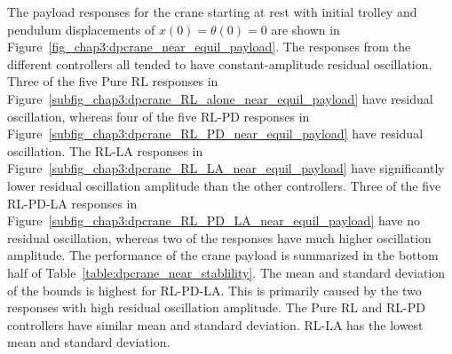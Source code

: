 The payload responses for the crane starting at rest with initial trolley and pendulum displacements of $x(0)=\theta(0)=0$ are shown in Figure~\ref{fig_chap3:dpcrane_near_equil_payload}. The responses from the different controllers all tended to have constant-amplitude residual oscillation.
%
Three of the five Pure RL responses in Figure~\ref{subfig_chap3:dpcrane_RL_alone_near_equil_payload} have residual oscillation, whereas four of the five RL-PD responses in Figure~\ref{subfig_chap3:dpcrane_RL_PD_near_equil_payload} have residual oscillation.
The RL-LA responses in Figure~\ref{subfig_chap3:dpcrane_RL_LA_near_equil_payload} have significantly lower residual oscillation amplitude than the other controllers.
%
%
Three of the five RL-PD-LA responses in Figure~\ref{subfig_chap3:dpcrane_RL_PD_LA_near_equil_payload} have no residual oscillation, whereas two of the responses have much higher oscillation amplitude. The performance of the crane payload is summarized in the bottom half of Table~\ref{table:dpcrane_near_stablility}. The mean and standard deviation of the bounds is highest for RL-PD-LA. This is primarily caused by the two responses with high residual oscillation amplitude. The Pure RL and RL-PD controllers have similar mean and standard deviation. RL-LA has the lowest mean and standard deviation.

